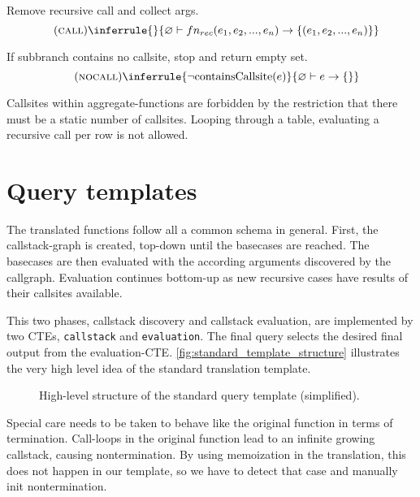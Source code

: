 Remove recursive call and collect args.
$$\quad(\textsc{call})\inferrule{
}{
    \varnothing \vdash fn_{rec}(e_1, e_2, ..., e_n) \rightarrow \{ (e_1, e_2, ..., e_n) \}
}$$

If subbranch contains no callsite, stop and return empty set.
$$\quad(\textsc{nocall})\inferrule{
\neg \text{containsCallsite}(e)
}{  
    \varnothing \vdash e \rightarrow \{\}
}$$

Callsites within aggregate-functions are forbidden by the restriction that there must be a static number of callsites. Looping through a table, evaluating a recursive call per row is not allowed.



\chapter{Query templates}
The translated functions follow all a common schema in general. First, the callstack-graph is created, top-down until the basecases are reached. The basecases are then evaluated with the according arguments discovered by the callgraph. Evaluation continues bottom-up as new recursive cases have results of their callsites available.

This two phases, callstack discovery and callstack evaluation, are implemented by two CTEs, \texttt{callstack} and \texttt{evaluation}. The final query selects the desired final output from the evaluation-CTE. \autoref{fig:standard_template_structure} illustrates the very high level idea of the standard translation template.

\begin{figure}[h!]
    \centering
    \caption{High-level structure of the standard query template (simplified).}
    \label{fig:standard_template_structure}
\end{figure}

Special care needs to be taken to behave like the original function in terms of termination. Call-loops in the original function lead to an infinite growing callstack, causing nontermination. By using memoization in the translation, this does not happen in our template, so we have to detect that case and manually init nontermination.


